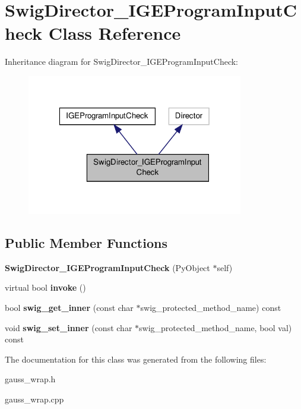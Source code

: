 \hypertarget{class_swig_director___i_g_e_program_input_check}{\section{Swig\-Director\-\_\-\-I\-G\-E\-Program\-Input\-Check Class Reference}
\label{class_swig_director___i_g_e_program_input_check}
}


Inheritance diagram for Swig\-Director\-\_\-\-I\-G\-E\-Program\-Input\-Check\-:\nopagebreak
\begin{figure}[H]
\begin{center}
\leavevmode
\includegraphics[width=268pt]{class_swig_director___i_g_e_program_input_check__inherit__graph}
\end{center}
\end{figure}
\subsection*{Public Member Functions}
\begin{DoxyCompactItemize}
\item 
\hypertarget{class_swig_director___i_g_e_program_input_check_ab8793415f2c73f577404967783ba6604}{{\bfseries Swig\-Director\-\_\-\-I\-G\-E\-Program\-Input\-Check} (Py\-Object $\ast$self)}\label{class_swig_director___i_g_e_program_input_check_ab8793415f2c73f577404967783ba6604}

\item 
\hypertarget{class_swig_director___i_g_e_program_input_check_a50598a1829a3634061eb4c3e60df8e6c}{virtual bool {\bfseries invoke} ()}\label{class_swig_director___i_g_e_program_input_check_a50598a1829a3634061eb4c3e60df8e6c}

\item 
\hypertarget{class_swig_director___i_g_e_program_input_check_a34e0ca8b1256a397561d8a68f5299c9a}{bool {\bfseries swig\-\_\-get\-\_\-inner} (const char $\ast$swig\-\_\-protected\-\_\-method\-\_\-name) const }\label{class_swig_director___i_g_e_program_input_check_a34e0ca8b1256a397561d8a68f5299c9a}

\item 
\hypertarget{class_swig_director___i_g_e_program_input_check_afcea5cf2774d5d0dcefea1ced6afeba2}{void {\bfseries swig\-\_\-set\-\_\-inner} (const char $\ast$swig\-\_\-protected\-\_\-method\-\_\-name, bool val) const }\label{class_swig_director___i_g_e_program_input_check_afcea5cf2774d5d0dcefea1ced6afeba2}

\end{DoxyCompactItemize}


The documentation for this class was generated from the following files\-:\begin{DoxyCompactItemize}
\item 
gauss\-\_\-wrap.\-h\item 
gauss\-\_\-wrap.\-cpp\end{DoxyCompactItemize}
